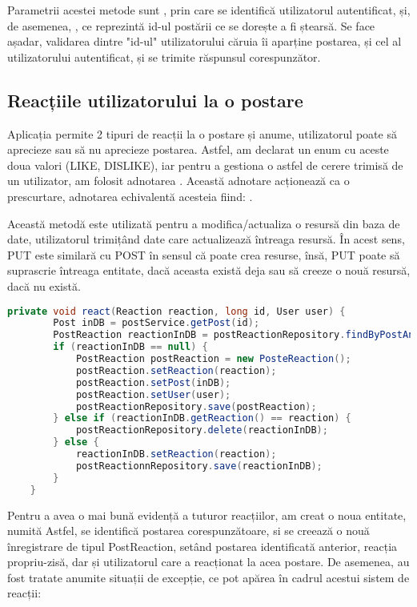 Parametrii acestei metode sunt , prin care se identifică utilizatorul autentificat, și, de asemenea, , ce reprezintă id-ul postării ce se dorește a fi ștearsă. Se face așadar, validarea dintre "id-ul" utilizatorului căruia îi aparține postarea, și cel al utilizatorului autentificat, și se trimite răspunsul corespunzător.\newline

\subsection{Reacțiile utilizatorului la o postare}

Aplicația permite 2 tipuri de reacții la o postare și anume, utilizatorul poate să aprecieze sau să nu aprecieze postarea. Astfel, am declarat un enum cu aceste doua valori (LIKE, DISLIKE), iar pentru a gestiona o astfel de cerere trimisă de un utilizator, am folosit adnotarea . Această adnotare acționează ca o prescurtare, adnotarea echivalentă acesteia fiind: .\newline

Această metodă este utilizată pentru a modifica/actualiza o resursă din baza de date, utilizatorul trimițând date care actualizează întreaga resursă. În acest sens, PUT este similară cu POST în sensul că poate crea resurse, însă, PUT poate să suprascrie întreaga entitate, dacă aceasta există deja sau să creeze o nouă resursă, dacă nu există.\newline

\begin{lstlisting}[language=Java]
	private void react(Reaction reaction, long id, User user) {
		Post inDB = postService.getPost(id);
		PostReaction reactionInDB = postReactionRepository.findByPostAndUser(inDB, user);
		if (reactionInDB == null) {
			PostReaction postReaction = new PosteReaction();
			postReaction.setReaction(reaction);
			postReaction.setPost(inDB);
			postReaction.setUser(user);
			postReactionRepository.save(postReaction);
		} else if (reactionInDB.getReaction() == reaction) {
			postReactionRepository.delete(reactionInDB);
		} else {
			reactionInDB.setReaction(reaction);
			postReactionnRepository.save(reactionInDB);
		}
	}
\end{lstlisting}
\bigskip

Pentru a avea o mai bună evidență a tuturor reacțiilor, am creat o noua entitate, numită  Astfel, se identifică postarea corespunzătoare, si se creează o nouă înregistrare de tipul PostReaction, setând postarea identificată anterior, reacția propriu-zisă, dar și utilizatorul care a reacționat la acea postare. De asemenea, au fost tratate anumite situații de excepție, ce pot apărea în cadrul acestui sistem de reacții:

